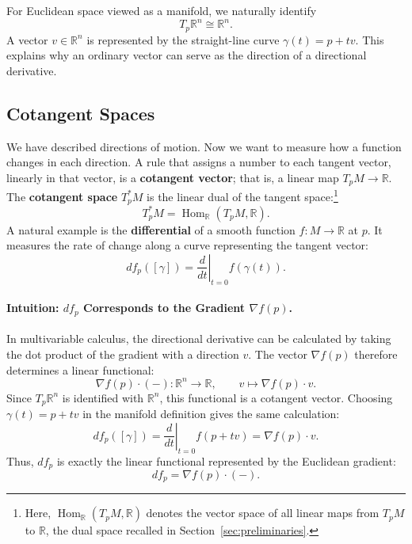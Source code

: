     For Euclidean space viewed as a manifold, we naturally identify
    \[
        T_p\mathbb{R}^n\cong\mathbb{R}^n.
    \]
    A vector $v\in\mathbb{R}^n$ is represented by the straight-line curve
    $\gamma(t)=p+tv$. This explains why an ordinary vector can serve as the
    direction of a directional derivative.

    \subsection{Cotangent Spaces}
    We have described directions of motion. Now we want to measure how a
    function changes in each direction. A rule that assigns a number to each
    tangent vector, linearly in that vector, is a \textbf{cotangent vector};
    that is, a linear map $T_pM\to\mathbb{R}$.
    The \textbf{cotangent space} $T_p^*M$ is the linear dual of the tangent
    space:\footnote{%
        Here, $\operatorname{Hom}_{\mathbb{R}}(T_pM,\mathbb{R})$ denotes the
        vector space of all linear maps from $T_pM$ to $\mathbb{R}$, the dual
        space recalled in Section~\ref{sec:preliminaries}.}
    \begin{equation}
        T_p^*M=\operatorname{Hom}_{\mathbb{R}}(T_pM,\mathbb{R}).
    \end{equation}
    A natural example is the \textbf{differential} of a smooth function
    $f\colon M\to\mathbb{R}$ at $p$. It measures the rate of change along a
    curve representing the tangent vector:
    \begin{equation}
        df_p([\gamma])=\left.\frac{d}{dt}\right|_{t=0}f(\gamma(t)).
    \end{equation}

    \paragraph{Intuition: $df_p$ Corresponds to the Gradient $\nabla f(p)$.}
    In multivariable calculus, the directional derivative can be calculated
    by taking the dot product of the gradient with a direction $v$. The vector
    $\nabla f(p)$ therefore determines a linear functional:
    \[
        \nabla f(p)\cdot(-)\colon\mathbb{R}^n\to\mathbb{R},
        \qquad v\mapsto\nabla f(p)\cdot v.
    \]
    Since $T_p\mathbb{R}^n$ is identified with $\mathbb{R}^n$, this functional
    is a cotangent vector. Choosing $\gamma(t)=p+tv$ in the manifold definition
    gives the same calculation:
    \begin{equation}
        df_p([\gamma])
        =\left.\frac{d}{dt}\right|_{t=0}f(p+tv)
        =\nabla f(p)\cdot v.
    \end{equation}
    Thus, $df_p$ is exactly the linear functional represented by the Euclidean
    gradient:
    \[
        df_p=\nabla f(p)\cdot(-).
    \]
